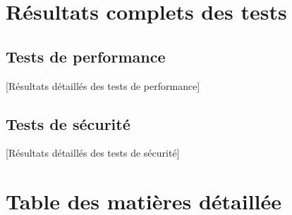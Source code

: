 \documentclass[12pt,a4paper]{report}
\begin{document}
\chapter{Résultats complets des tests}
\label{annexe:tests}

\section{Tests de performance}
\label{annexe:performance}
[Résultats détaillés des tests de performance]

\section{Tests de sécurité}
\label{annexe:security}
[Résultats détaillés des tests de sécurité]

\newpage
\chapter*{Table des matières détaillée}
\tableofcontents
\end{document}
